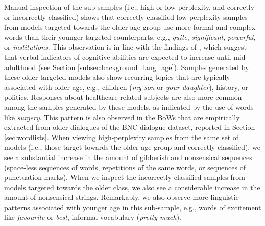Manual inspection of the sub-samples (i.e., high or low perplexity, and correctly or incorrectly classified) shows that correctly classified low-perplexity samples from models targeted towards the older age group use more formal and complex words than their younger targeted counterparts, e.g., \textit{quite}, \textit{significant}, \textit{powerful}, or \textit{institutions}. 
This observation is in line with the findings of \cite{pennebaker2003words}, which suggest that verbal indicators of cognitive abilities are expected to increase until mid-adulthood (see Section \ref{subsec:background_lang_age}).
Samples generated by these older targeted models also show recurring topics that are typically associated with older age, e.g., children (\textit{my son} or \textit{your daughter}), history, or politics. 
Responses about healthcare related subjects are also more common among the samples generated by these models, as indicated by the use of words like \textit{surgery}. This pattern is also observed in the BoWs that are empirically extracted from older dialogues of the BNC dialogue dataset, reported in Section \ref{sec:wordlists}. When viewing high-perplexity samples from the same set of models (i.e., those target towards the older age group and correctly classified), we see a substantial increase in the amount of gibberish and nonsensical sequences (space-less sequences of words, repetitions of the same words, or sequences of punctuation marks). When we inspect the incorrectly classified samples from models targeted towards the older class, we also see a considerable increase in the amount of nonsensical strings. Remarkably, we also observe more linguistic patterns associated with younger age in this sub-sample, e.g., words of excitement like \textit{favourite} or \textit{best}, informal vocabulary (\textit{pretty much}).

